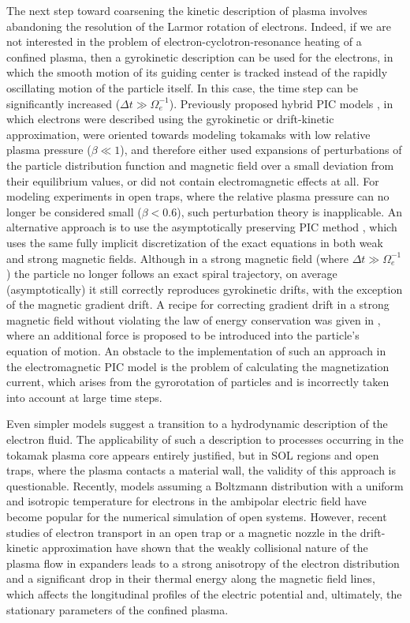 \documentclass[final,3p]{elsarticle}
\begin{document}
The next step toward coarsening the kinetic description of plasma involves abandoning the resolution of the Larmor rotation of electrons. Indeed, if we are not interested in the problem of electron-cyclotron-resonance heating of a confined plasma, then a gyrokinetic description can be used for the electrons, in which the smooth motion of its guiding center is tracked instead of the rapidly oscillating motion of the particle itself. In this case, the time step can be significantly increased ($\Delta t\gg \Omega_e^{-1}$). Previously proposed hybrid PIC models \cite{Lee1978, Chen2009, Chen2019, Meng2025, Kurshakov2026}, in which electrons were described using the gyrokinetic or drift-kinetic approximation, were oriented towards modeling tokamaks with low relative plasma pressure ($\beta\ll 1$), and therefore either used expansions of perturbations of the particle distribution function and magnetic field over a small deviation from their equilibrium values, or did not contain electromagnetic effects at all. For modeling experiments in open traps, where the relative plasma pressure can no longer be considered small ($\beta< 0.6$), such perturbation theory is inapplicable. An alternative approach is to use the asymptotically preserving PIC method \cite{Ricketson2020,Ricketson2024}, which uses the same fully implicit discretization of the exact equations in both weak and strong magnetic fields. Although in a strong magnetic field (where $\Delta t\gg \Omega_e^{-1}$) the particle no longer follows an exact spiral trajectory, on average (asymptotically) it still correctly reproduces gyrokinetic drifts, with the exception of the magnetic gradient drift. A recipe for correcting gradient drift in a strong magnetic field without violating the law of energy conservation was given in \cite{Ricketson2020}, where an additional force is proposed to be introduced into the particle's equation of motion. An obstacle to the implementation of such an approach in the electromagnetic PIC model is the problem of calculating the magnetization current, which arises from the gyrorotation of particles and is incorrectly taken into account at large time steps.

Even simpler models suggest a transition to a hydrodynamic description of the electron fluid. The applicability of such a description to processes occurring in the tokamak plasma core appears entirely justified, but in SOL regions and open traps, where the plasma contacts a material wall, the validity of this approach is questionable. Recently, models assuming a Boltzmann distribution with a uniform and isotropic temperature for electrons in the ambipolar electric field \cite{Groenewald2025,Tran2025} have become popular for the numerical simulation of open systems. However, recent studies of electron transport in an open trap \cite{Glinskiy2024,Glinskiy2026} or a magnetic nozzle \cite{Tyushev2025} in the drift-kinetic approximation have shown that the weakly collisional nature of the plasma flow in expanders leads to a strong anisotropy of the electron distribution and a significant drop in their thermal energy along the magnetic field lines, which affects the longitudinal profiles of the electric potential and, ultimately, the stationary parameters of the confined plasma.
\end{document}
